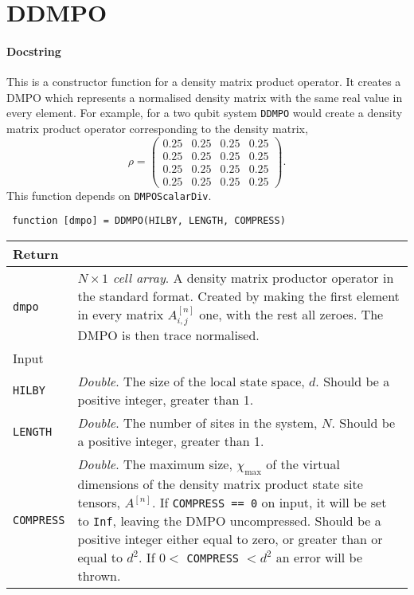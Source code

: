  \section{DDMPO}
 \paragraph{Docstring} This is a constructor function for a density matrix product operator. It creates a DMPO which represents a normalised density matrix with the same real value in every element. For example, for a two qubit system \lstinline$DDMPO$ would create a density matrix product operator corresponding to the density matrix,
 \begin{equation}
 \rho = \begin{pmatrix}
 0.25 & 0.25 & 0.25 & 0.25 \\
 0.25 & 0.25 & 0.25 & 0.25 \\
 0.25 & 0.25 & 0.25 & 0.25 \\
 0.25 & 0.25 & 0.25 & 0.25 \end{pmatrix}.
 \label{eq:vs3-4}
 \end{equation}
 This function depends on \lstinline$DMPOScalarDiv$.
 \begin{lstlisting}
 function [dmpo] = DDMPO(HILBY, LENGTH, COMPRESS) \end{lstlisting}
 \begin{longtabu}{X[1,l]X[4,l]}
 \hline
 Return & \\ \hline
 \lstinline$dmpo$ & \emph{\(N \times 1\) cell array}. A density matrix productor operator in the standard format. Created by making the first element in every matrix \(A^{[n]}_{i,j}\) one, with the rest all zeroes. The DMPO is then trace normalised.  \\ \hline
 Input & \\ \hline
 \lstinline$HILBY$ & \emph{Double}. The size of the local state space, \(d\). Should be a positive integer, greater than 1. \\
 \lstinline$LENGTH$ & \emph{Double}. The number of sites in the system, \(N\). Should be a positive integer, greater than 1. \\
 \lstinline$COMPRESS$ & \emph{Double}. The maximum size, \(\chi_{\mathrm{max}}\) of the virtual dimensions of the density matrix product state site tensors, \(A^{[n]}\). If \lstinline$COMPRESS == 0$ on input, it will be set to \lstinline$Inf$, leaving the DMPO uncompressed. Should be a positive integer either equal to zero, or greater than or equal to \(d^{2}\). If \(0 <\) \lstinline$COMPRESS$ \(< d^{2}\) an error will be thrown. \\
 \hline
 \end{longtabu}
